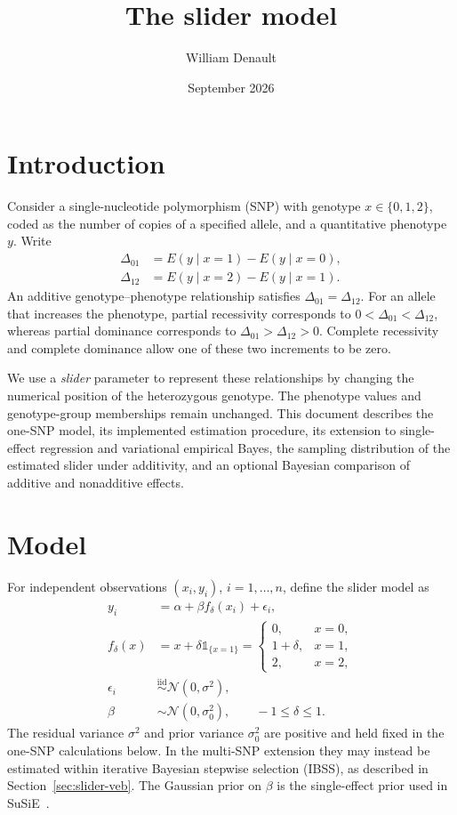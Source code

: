 \documentclass[11pt]{article}
\title{The slider model}
\author{William Denault}
\date{September 2026}
\newcommand{\ind}{\mathbb{1}}
\newcommand{\Normal}{\mathcal{N}}
\begin{document}
\maketitle

\section{Introduction}

Consider a single-nucleotide polymorphism (SNP) with genotype
$x\in\{0,1,2\}$, coded as the number of copies of a specified allele,
and a quantitative phenotype $y$. Write
\begin{align}
\Delta_{01} &= E(y\mid x=1)-E(y\mid x=0),\\
\Delta_{12} &= E(y\mid x=2)-E(y\mid x=1).
\end{align}
An additive genotype--phenotype relationship satisfies
$\Delta_{01}=\Delta_{12}$. For an allele that increases the phenotype,
partial recessivity corresponds to $0<\Delta_{01}<\Delta_{12}$,
whereas partial dominance corresponds to
$\Delta_{01}>\Delta_{12}>0$. Complete recessivity and complete dominance
allow one of these two increments to be zero.

We use a \emph{slider} parameter to represent these relationships by
changing the numerical position of the heterozygous genotype. The
phenotype values and genotype-group memberships remain unchanged.
This document describes the one-SNP model, its implemented estimation
procedure, its extension to single-effect regression and variational
empirical Bayes, the sampling distribution of the estimated slider
under additivity, and an optional Bayesian comparison of additive
and nonadditive effects.

\section{Model}

For independent observations $(x_i,y_i)$, $i=1,\ldots,n$, define the slider model as
\begin{align}
y_i &= \alpha+\beta f_\delta(x_i)+\epsilon_i,
    \label{eq:model}\\
f_\delta(x) &= x+\delta\ind_{\{x=1\}}
 =\begin{cases}
 0,&x=0,\\
 1+\delta,&x=1,\\
 2,&x=2,
 \end{cases}
    \label{eq:coding}\\
\epsilon_i &\overset{\mathrm{iid}}{\sim}\Normal(0,\sigma^2),\\
\beta &\sim\Normal(0,\sigma_0^2),\qquad -1\leq\delta\leq1.
    \label{eq:prior}
\end{align}
The residual variance $\sigma^2$ and prior variance $\sigma_0^2$ are
positive and held fixed in the one-SNP calculations below. In the
multi-SNP extension they may instead be estimated within iterative
Bayesian stepwise selection (IBSS), as described in
Section~\ref{sec:slider-veb}. The Gaussian prior on $\beta$ is the
single-effect prior used in SuSiE~\cite{wang2020susie}.
\end{document}
